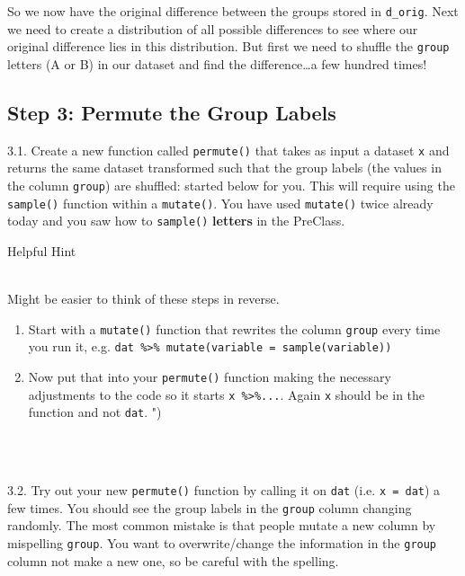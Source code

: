 \documentclass[]{book}
\newenvironment{Shaded}{\begin{snugshade}}{\end{snugshade}}
\newcommand{\ControlFlowTok}[1]{\textcolor[rgb]{0.13,0.29,0.53}{\textbf{#1}}}
\newcommand{\NormalTok}[1]{#1}
\newcommand{\OperatorTok}[1]{\textcolor[rgb]{0.81,0.36,0.00}{\textbf{#1}}}
\newcommand{\StringTok}[1]{\textcolor[rgb]{0.31,0.60,0.02}{#1}}
\newenvironment{info}
    {
    \hline\\
    }
    { 
    \\\\\hline
    }
\begin{document}
So we now have the original difference between the groups stored in \texttt{d\_orig}. Next we need to create a distribution of all possible differences to see where our original difference lies in this distribution. But first we need to shuffle the \texttt{group} letters (A or B) in our dataset and find the difference\ldots{}a few hundred times!

\hypertarget{Ch5InClassQueT3}{%
\subsection{Step 3: Permute the Group Labels}\label{Ch5InClassQueT3}}

3.1. Create a new function called \texttt{permute()} that takes as input a dataset \texttt{x} and returns the same dataset transformed such that the group labels (the values in the column \texttt{group}) are shuffled: started below for you. This will require using the \texttt{sample()} function within a \texttt{mutate()}. You have used \texttt{mutate()} twice already today and you saw how to \texttt{sample()} \textbf{letters} in the PreClass.

\begin{Shaded}
\end{Shaded}

Helpful Hint

\begin{info}
Might be easier to think of these steps in reverse.

\begin{enumerate}
.{enumi{enumi}.}
\item
  Start with a \texttt{mutate()} function that rewrites the column
  \texttt{group} every time you run it, e.g.
  \texttt{dat\ \%\textgreater{}\%\ mutate(variable\ =\ sample(variable))}
\item
  Now put that into your \texttt{permute()} function making the
  necessary adjustments to the code so it starts
  \texttt{x\ \%\textgreater{}\%...}. Again \texttt{x} should be in the
  function and not \texttt{dat}. ")
\end{enumerate}
\end{info}

3.2. Try out your new \texttt{permute()} function by calling it on \texttt{dat} (i.e. \texttt{x\ =\ dat}) a few times. You should see the group labels in the \texttt{group} column changing randomly. The most common mistake is that people mutate a new column by mispelling \texttt{group}. You want to overwrite/change the information in the \texttt{group} column not make a new one, so be careful with the spelling.
\end{document}
